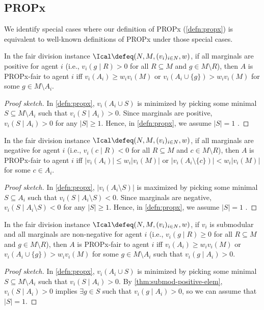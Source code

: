 \subsection{PROPx}
\label{sec:notions:propx}

We identify special cases where our definition of PROPx (\cref{defn:propx})
is equivalent to well-known definitions of PROPx under those special cases.

\begin{lemma}
\label{thm:propx-equiv-positive}
In the fair division instance $\Ical \defeq (N, M, (v_i)_{i \in N}, w)$,
if all marginals are positive for agent $i$
(i.e., $v_i(g \mid R) > 0$ for all $R \subseteq M$ and $g \in M \setminus R$),
then $A$ is PROPx-fair to agent $i$ iff $v_i(A_i) \ge w_iv_i(M)$ or
$v_i(A_i \cup \{g\}) > w_iv_i(M)$ for some $g \in M \setminus A_i$.
\end{lemma}
\begin{proof}[Proof sketch]
In \cref{defn:propx}, $v_i(A_i \cup S)$ is minimized by picking
some minimal $S \subseteq M \setminus A_i$ such that $v_i(S \mid A_i) > 0$.
Since marginals are positive, $v_i(S \mid A_i) > 0$ for any $|S| \ge 1$.
Hence, in \cref{defn:propx}, we assume $|S| = 1$ \wLoG{}.
\end{proof}

\begin{lemma}
\label{thm:propx-equiv-negative}
In the fair division instance $\Ical \defeq (N, M, (v_i)_{i \in N}, w)$,
if all marginals are negative for agent $i$
(i.e., $v_i(c \mid R) < 0$ for all $R \subseteq M$ and $c \in M \setminus R$),
then $A$ is PROPx-fair to agent $i$ iff $|v_i(A_i)| \le w_i|v_i(M)|$ or
$|v_i(A_i \setminus \{c\})| < w_i|v_i(M)|$ for some $c \in A_i$.
\end{lemma}
\begin{proof}[Proof sketch]
In \cref{defn:propx}, $|v_i(A_i \setminus S)|$ is maximized by picking
some minimal $S \subseteq A_i$ such that $v_i(S \mid A_i \setminus S) < 0$.
Since marginals are negative, $v_i(S \mid A_i \setminus S) < 0$ for any $|S| \ge 1$.
Hence, in \cref{defn:propx}, we assume $|S| = 1$ \wLoG{}.
\end{proof}

\begin{lemma}
\label{thm:propx-equiv-submod-goods}
In the fair division instance $\Ical \defeq (N, M, (v_i)_{i \in N}, w)$,
if $v_i$ is submodular and all marginals are non-negative for agent $i$
(i.e., $v_i(g \mid R) \ge 0$ for all $R \subseteq M$ and $g \in M \setminus R$),
then $A$ is PROPx-fair to agent $i$ iff $v_i(A_i) \ge w_iv_i(M)$ or
$v_i(A_i \cup \{g\}) > w_iv_i(M)$ for some $g \in M \setminus A_i$ such that $v_i(g \mid A_i) > 0$.
\end{lemma}
\begin{proof}[Proof sketch]
In \cref{defn:propx}, $v_i(A_i \cup S)$ is minimized by picking
some minimal $S \subseteq M \setminus A_i$ such that $v_i(S \mid A_i) > 0$.
By \cref{thm:submod-positive-elem}, $v_i(S \mid A_i) > 0$ implies $\exists g \in S$
such that $v_i(g \mid A_i) > 0$, so we can assume \wLoG{} that $|S| = 1$.
\end{proof}

